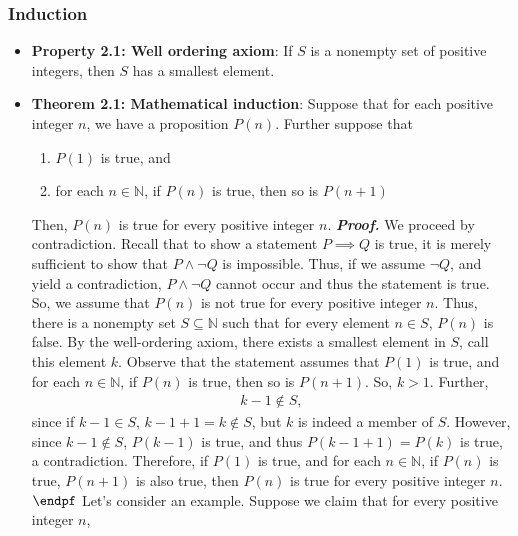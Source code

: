 \documentclass{report}
\begin{document}
    \subsubsection{Induction}
    \begin{itemize}
        \item \textbf{Property 2.1: Well ordering axiom}: If $S$ is a nonempty set of positive integers, then $S$ has a smallest element.
        \item \textbf{Theorem 2.1: Mathematical induction}: Suppose that for each positive integer $n$, we have a proposition $P(n)$. Further suppose that  
            \begin{enumerate}
                \item $P(1)$ is true, and
                \item for each $n \in \mathbb{N}$, if $P(n)$ is true, then so is $P(n+1) $
            \end{enumerate}
            Then, $P(n)$ is true for every positive integer $n$.
            \bigbreak \noindent 
            \textbf{\textit{Proof.}} We proceed by contradiction. Recall that to show a statement $P \implies Q$ is true, it is merely sufficient to show that $P \land \neg Q$ is impossible. Thus, if we assume $\neg Q$, and yield a contradiction, $P \land \neg Q$ cannot occur and thus the statement is true. 
            \bigbreak \noindent 
            So, we assume that $P(n)$ is not true for every positive integer $n$. Thus, there is a nonempty set $S \subseteq \mathbb{N}$ such that for every element $n \in S$, $P(n)$ is false. By the well-ordering axiom, there exists a smallest element in $S$, call this element $k$.
            \bigbreak \noindent 
            Observe that the statement assumes that $P(1)$ is true, and for each $n \in \mathbb{N}$, if $P(n)$ is true, then so is $P(n+1)$. So, $k > 1$. Further,
            \begin{align*}
                k-1 \not\in S
            ,\end{align*}
            since  if $k-1 \in S$, $k-1+1 = k \not\in S$, but $k$ is indeed a member of $S$. However, since $k-1 \not\in S$, $P(k-1)$ is true, and thus $P(k-1+1) = P(k)$ is true, a contradiction.
            \bigbreak \noindent 
            Therefore, if $P(1)$ is true, and for each $n \in \mathbb{N}$, if $P(n)$ is true, $P(n+1)$ is also true, then $P(n)$ is true for every positive integer $n$. $\endpf$
            \bigbreak \noindent 
            Let's consider an example. Suppose we claim that for every positive integer $n$,
            \begin{align*}

\end{align*}
\end{itemize}
\end{document}
